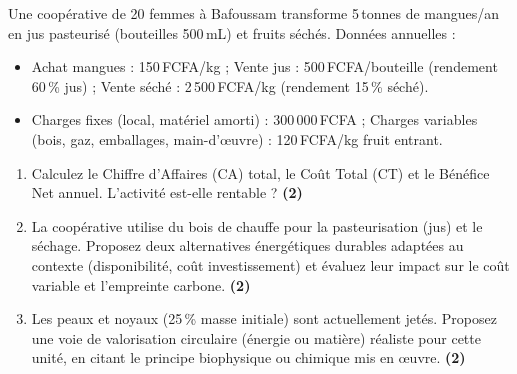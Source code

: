 \documentclass[11pt]{article}
\begin{document}
\begin{exercice}
Une coopérative de 20 femmes à Bafoussam transforme 5\,tonnes de mangues/an en jus pasteurisé (bouteilles 500\,mL) et fruits séchés. Données annuelles :
\begin{itemize}
    \item Achat mangues : 150\,FCFA/kg ; Vente jus : 500\,FCFA/bouteille (rendement 60\,\% jus) ; Vente séché : 2\,500\,FCFA/kg (rendement 15\,\% séché).
    \item Charges fixes (local, matériel amorti) : 300\,000\,FCFA ; Charges variables (bois, gaz, emballages, main-d'œuvre) : 120\,FCFA/kg fruit entrant.
\end{itemize}
\begin{enumerate}
    \item Calculez le Chiffre d'Affaires (CA) total, le Coût Total (CT) et le Bénéfice Net annuel. L'activité est-elle rentable ? \hfill \textbf{(2)}
    \item La coopérative utilise du bois de chauffe pour la pasteurisation (jus) et le séchage. Proposez deux alternatives énergétiques durables adaptées au contexte (disponibilité, coût investissement) et évaluez leur impact sur le coût variable et l'empreinte carbone. \hfill \textbf{(2)}
    \item Les peaux et noyaux (25\,\% masse initiale) sont actuellement jetés. Proposez une voie de valorisation circulaire (énergie ou matière) réaliste pour cette unité, en citant le principe biophysique ou chimique mis en œuvre. \hfill \textbf{(2)}
\end{enumerate}
\end{exercice}
\end{document}
